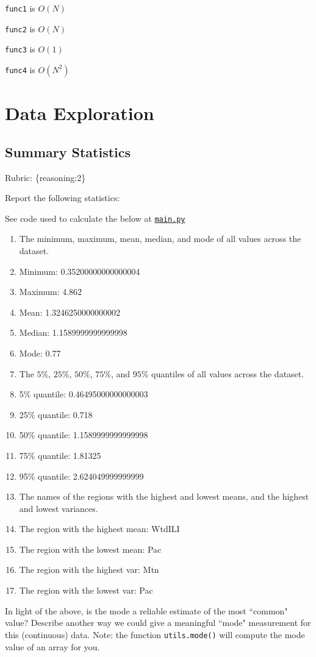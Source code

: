 \documentclass{article}
\def\rubric#1{\gre{Rubric: \{#1\}}}{}
\def\blu#1{{\color{blu}#1}}
\def\gre#1{{\color{gre}#1}}
\def\enum#1{\begin{enumerate}#1\end{enumerate}}
\begin{document}
\gre{\texttt{func1} is $O(N)$}

\gre{\texttt{func2} is $O(N)$}

\gre{\texttt{func3} is $O(1)$}

\gre{\texttt{func4} is $O(N^2)$}

\section{Data Exploration}

\subsection{Summary Statistics}
\rubric{reasoning:2}

\blu{Report the following statistics}:

\gre{See code used to calculate the below at \hyperlink{main.py}{\texttt{main.py}}}
\enum{
\item The minimum, maximum, mean, median, and mode of all values across the dataset.
\item[] \gre{Minimum: 0.35200000000000004}
\item[] \gre{Maximum: 4.862}
\item[] \gre{Mean: 1.3246250000000002}
\item[] \gre{Median: 1.1589999999999998}
\item[] \gre{Mode: 0.77}
\item The $5\%$, $25\%$, $50\%$, $75\%$, and $95\%$ quantiles of all values across the dataset.
\item[] \gre{5\% quantile: 0.46495000000000003}
\item[] \gre{25\% quantile: 0.718}
\item[] \gre{50\% quantile: 1.1589999999999998}
\item[] \gre{75\% quantile: 1.81325}
\item[] \gre{95\% quantile: 2.624049999999999}
\item The names of the regions with the highest and lowest means, and the highest and lowest variances.
\item[] \gre{The region with the highest mean: WtdILI}
\item[] \gre{The region with the lowest mean: Pac}
\item[] \gre{The region with the highest var: Mtn}
\item[] \gre{The region with the lowest var: Pac}
}
In light of the above, \blu{is the mode a reliable estimate of the most ``common" value? Describe another way we could give a meaningful ``mode" measurement for this (continuous) data.} Note: the function \texttt{utils.mode()} will compute the mode value of an array for you.
\end{document}
